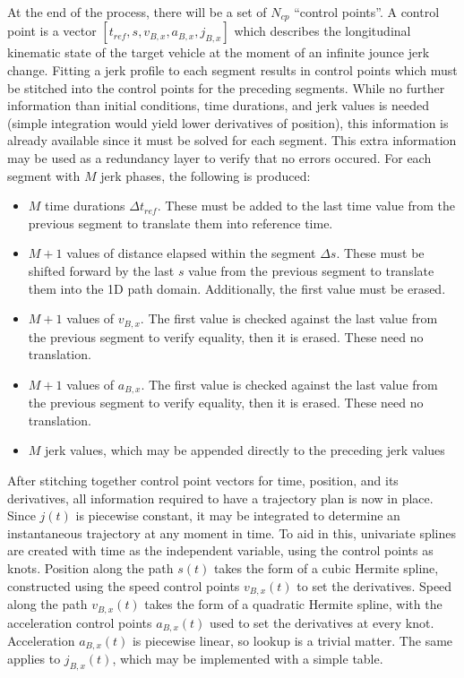 \documentclass[letterpaper, 10 pt, conference]{ieeeconf}  %
\begin{document}
At the end of the process, there will be a set of $N_{cp}$ ``control points''.
A control point is a vector $[t_{ref}, s, v_{B,x}, a_{B,x}, j_{B,x}]$ which describes the longitudinal kinematic state of the target vehicle at the moment of an infinite jounce jerk change.
Fitting a jerk profile to each segment results in control points which must be stitched into the control points for the preceding segments.
While no further information than initial conditions, time durations, and jerk values is needed (simple integration would yield lower derivatives of position), this information is already available since it must be solved for each segment.
This extra information may be used as a redundancy layer to verify that no errors occured.
For each segment with $M$ jerk phases, the following is produced:
\begin{itemize}
  \item $M$ time durations $\Delta t_{ref}$. These must be added to the last time value from the previous segment to translate them into reference time.
  \item $M+1$ values of distance elapsed within the segment $\Delta s$. These must be shifted forward by the last $s$ value from the previous segment to translate them into the 1D path domain. Additionally, the first value must be erased.
  \item $M+1$ values of $v_{B,x}$. The first value is checked against the last value from the previous segment to verify equality, then it is erased. These need no translation.
  \item $M+1$ values of $a_{B,x}$. The first value is checked against the last value from the previous segment to verify equality, then it is erased. These need no translation.
  \item $M$ jerk values, which may be appended directly to the preceding jerk values
\end{itemize}

After stitching together control point vectors for time, position, and its derivatives, all information required to have a trajectory plan is now in place.
Since $j(t)$ is piecewise constant, it may be integrated to determine an instantaneous trajectory at any moment in time.
To aid in this, univariate splines are created with time as the independent variable, using the control points as knots.
Position along the path $s(t)$ takes the form of a cubic Hermite spline, constructed using the speed control points $v_{B,x}(t)$ to set the derivatives.
Speed along the path $v_{B,x}(t)$ takes the form of a quadratic Hermite spline, with the acceleration control points $a_{B,x}(t)$ used to set the derivatives at every knot.
Acceleration $a_{B,x}(t)$ is piecewise linear, so lookup is a trivial matter.
The same applies to $j_{B,x}(t)$, which may be implemented with a simple table.
\end{document}
